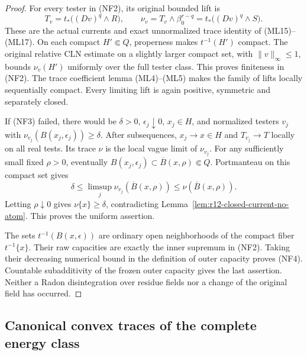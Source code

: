 \documentclass[11pt,a4paper]{article}
\numberwithin{equation}{section}
\theoremstyle{definition}
\theoremstyle{remark}
\begin{document}
\begin{proof}
For every tester in (NF2), its original bounded lift is
\[
             T_v=t_*\bigl((Dv)^q\wedge R\bigr),\qquad
             \nu_v=T_v\wedge\beta_0^{r-q}
                       =t_*\bigl((Dv)^q\wedge S\bigr).
 \tag{NF5}
\]
These are the actual currents and exact unnormalized trace
identity of (ML15)--(ML17). On each compact $H'\Subset Q$,
properness makes $t^{-1}(H')$ compact. The original relative
CLN estimate on a slightly larger compact set, with
$\|v\|_\infty\leq1$, bounds $\nu_v(H')$ uniformly over
the full tester class. This proves finiteness in (NF2).
The trace coefficient lemma (ML4)--(ML5) makes the family
of lifts locally sequentially compact. Every limiting lift
is again positive, symmetric and separately closed.

If (NF3) failed, there would be $\delta>0$,
$\epsilon_j\downarrow0$, $x_j\in H$, and normalized
testers $v_j$ with
$\nu_{v_j}(B(x_j,\epsilon_j))\geq\delta$.
After subsequences, $x_j\to x\in H$ and $T_{v_j}\to T$
locally on all real tests. Its trace $\nu$ is the local vague
limit of $\nu_{v_j}$. For any sufficiently small fixed
$\rho>0$, eventually
$B(x_j,\epsilon_j)\subset\overline B(x,\rho)\Subset Q$.
Portmanteau on this compact set gives
\[
      \delta\leq\limsup_j\nu_{v_j}(\overline B(x,\rho))
                              \leq\nu(\overline B(x,\rho)).
\]
Letting $\rho\downarrow0$ gives $\nu\{x\}\geq\delta$,
contradicting Lemma~\ref{lem:r12-closed-current-no-atom}.
This proves the uniform assertion.

The sets $t^{-1}(B(x,\epsilon))$ are ordinary open
neighborhoods of the compact fiber $t^{-1}\{x\}$.
Their raw capacities are exactly the inner supremum in
(NF2). Taking their decreasing numerical bound in the
definition of outer capacity proves (NF4). Countable
subadditivity of the frozen outer capacity gives the last
assertion. Neither a Radon disintegration over residue
fields nor a change of the original field has occurred.
\end{proof}

\subsection{Canonical convex traces of the complete energy class}
\end{document}
